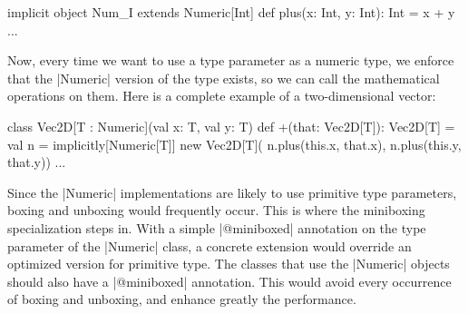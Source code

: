 \begin{lstlisting-nobreak}
 implicit object Num_I extends Numeric[Int] {
   def plus(x: Int, y: Int): Int = x + y
   ...
 }
\end{lstlisting-nobreak}

Now, every time we want to use a type parameter as a numeric type, we enforce that the |Numeric| version of the type exists, so we can call the mathematical operations on them. Here is a complete example of a two-dimensional vector:

\begin{lstlisting-nobreak}
 class Vec2D[T : Numeric](val x: T, val y: T) {
   def +(that: Vec2D[T]): Vec2D[T] = {
     val n = implicitly[Numeric[T]]
     new Vec2D[T](
       n.plus(this.x, that.x),
       n.plus(this.y, that.y))
   }
   ...
 }
\end{lstlisting-nobreak}

Since the |Numeric| implementations are likely to use primitive type parameters, boxing and unboxing would frequently occur. This is where the miniboxing specialization steps in. With a simple |@miniboxed| annotation on the type parameter of the |Numeric| class, a concrete extension would override an optimized version for primitive type. The classes that use the |Numeric| objects should also have a |@miniboxed| annotation. This would avoid every occurrence of boxing and unboxing, and enhance greatly the performance.